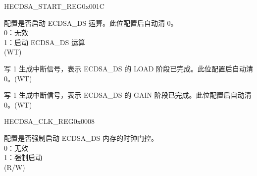 \begin{register}{H}{ECDSA\_START\_REG}{0x001C}\label{regdesc:ECDSASTARTREG}
%
%
%
%
\regnewline%
\begin{regdesc}\begin{reglist}
\label{fielddesc:ECDSASTART}\item [ECDSA\_START] 配置是否启动 ECDSA\_DS 运算。此位配置后自动清 0。\\
0：无效\\
1：启动 ECDSA\_DS 运算\\
(WT)
\label{fielddesc:ECDSALOADDONE}\item [ECDSA\_LOAD\_DONE] 写 1 生成中断信号，表示 ECDSA\_DS 的 LOAD 阶段已完成。此位配置后自动清 0。(WT)
\label{fielddesc:ECDSAGETDONE}\item [ECDSA\_GET\_DONE] 写 1 生成中断信号，表示 ECDSA\_DS 的 GAIN 阶段已完成。此位配置后自动清 0。(WT)
\end{reglist}\end{regdesc}
\end{register}


\begin{register}{H}{ECDSA\_CLK\_REG}{0x0008}\label{regdesc:ECDSACLKREG}
%
%
\regnewline%
\begin{regdesc}\begin{reglist}
\label{fielddesc:ECDSACLKGATEFORCEON}\item [ECDSA\_CLK\_GATE\_FORCE\_ON] 配置是否强制启动 ECDSA\_DS 内存的时钟门控。\\
0：无效\\
1：强制启动\\
(R/W)
\end{reglist}\end{regdesc}
\end{register}


